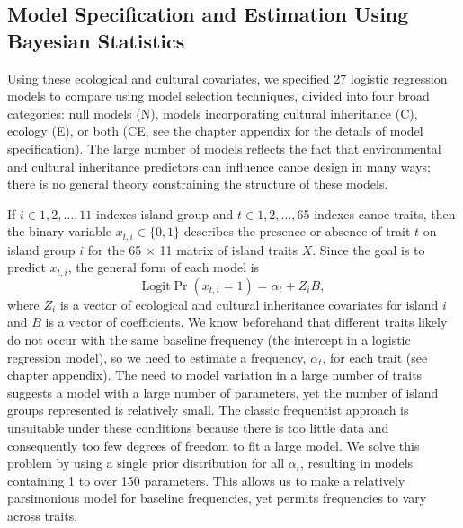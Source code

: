 \subsection{Model Specification and Estimation Using Bayesian Statistics}

    Using these ecological and cultural covariates, we specified 27 logistic regression models to compare using model selection techniques, divided into four broad categories: null models (N), models incorporating cultural inheritance (C), ecology (E), or both (CE, see the chapter appendix for the details of model specification). The large number of models reflects the fact that environmental and cultural inheritance predictors can influence canoe design in many ways; there is no general theory constraining the structure of these models.

If $i \in {1,2,\dots ,11}$ indexes island group and $t \in {1,2, \dots , 65}$ indexes canoe traits, then the binary variable $x_{t,i} \in \{0,1\}$ describes the presence or absence of trait $t$ on island group $i$ for the 65 $\times$ 11 matrix of island traits $X$. Since the goal is to predict $x_{t,i}$, the general form of each model is
    \[\mathrm{Logit} \Pr( x_{t,i}=1 ) = \alpha_t + Z_i B,
\]
where $Z_i$ is a vector of ecological and cultural inheritance covariates for island $i$ and $B$ is a vector of coefficients. We know beforehand that different traits likely do not occur with the same baseline frequency (the intercept in a logistic regression model), so we need to estimate a frequency, $\alpha_t$, for each trait (see chapter appendix). The need to model variation in a large number of traits suggests a model with a large number of parameters, yet the number of island groups represented is relatively small. The classic frequentist approach is unsuitable under these conditions because there is too little data and consequently too few degrees of freedom to fit a large model. We solve this problem by using a single prior distribution for all $\alpha_t$, resulting in models containing 1 to over 150 parameters. This allows us to make a relatively parsimonious model for baseline frequencies, yet permits frequencies to vary across traits.

